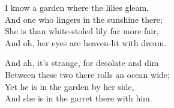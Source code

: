 
\begin{poemblock}
I know a garden where the lilies gleam,\\
\idt And one who lingers in the sunshine there;\\
She is than white-stoled lily far more fair,\\
\idt And oh, her eyes are heaven-lit with dream.


And ah, it's strange, for desolate and dim\\
\idt Between these two there rolls an ocean wide;\\
Yet he is in the garden by her side,\\
\idt And she is in the garret there with him.

\end{poemblock}
